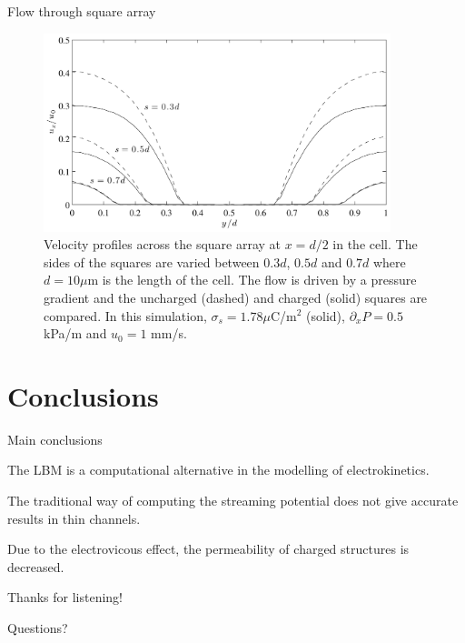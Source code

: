 \begin{frame}{Flow through square array}

\begin{figure}
\begin{center}
\includegraphics[width=0.9\textwidth]{../fig/square_u_mid.pdf}
\end{center}
\caption{Velocity profiles across the square array at $x = d/2$ in the
  cell. The sides of the squares are varied between $0.3d$, $0.5d$ and
  $0.7d$ where $d = 10 \mu$m is the length of the cell. The flow is
  driven by a pressure gradient and the uncharged (dashed) and charged
  (solid) squares are compared. In this simulation, $\sigma_s = 1.78
  \mu$C/m$^2$ (solid), $\partial_xP = 0.5$ kPa/m and $u_0 = 1$ mm/s. }
\label{fig:res:mid}
\end{figure}

\end{frame}

\section{Conclusions}

\begin{frame}{Main conclusions}

\begin{itemize*}

\item The LBM is a computational alternative in the modelling of
  electrokinetics.

\item The traditional way of computing the streaming potential does
  not give accurate results in thin channels. 

\item Due to the electrovicous effect, the permeability of charged
  structures is decreased.

\end{itemize*}

\end{frame}


\begin{frame}

\begin{center}
\Huge{Thanks for listening!}
\end{center}

\begin{center}
\Huge{Questions?}
\end{center}
\end{frame}
